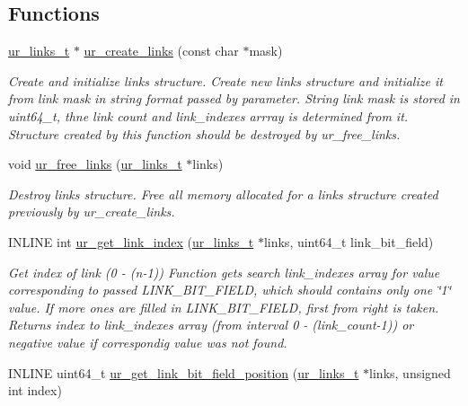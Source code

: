 \subsection*{Functions}
\begin{DoxyCompactItemize}
\item 
\hyperlink{structur__links__t}{ur\+\_\+links\+\_\+t} $\ast$ \hyperlink{group__ur__links_ga79615b30cdec474a94bb5ce5f3eeb34f}{ur\+\_\+create\+\_\+links} (const char $\ast$mask)
\begin{DoxyCompactList}\small\item\em Create and initialize links structure. Create new links structure and initialize it from link mask in string format passed by parameter. String link mask is stored in uint64\+\_\+t, thne link count and link\+\_\+indexes arrray is determined from it. Structure created by this function should be destroyed by ur\+\_\+free\+\_\+links. \end{DoxyCompactList}\item 
void \hyperlink{group__ur__links_ga7e1802498fc99e49f98eada58ff0d883}{ur\+\_\+free\+\_\+links} (\hyperlink{structur__links__t}{ur\+\_\+links\+\_\+t} $\ast$links)
\begin{DoxyCompactList}\small\item\em Destroy links structure. Free all memory allocated for a links structure created previously by ur\+\_\+create\+\_\+links. \end{DoxyCompactList}\item 
I\+N\+L\+I\+NE int \hyperlink{group__ur__links_ga20fe681784b2536ad4293ed1d2932da2}{ur\+\_\+get\+\_\+link\+\_\+index} (\hyperlink{structur__links__t}{ur\+\_\+links\+\_\+t} $\ast$links, uint64\+\_\+t link\+\_\+bit\+\_\+field)
\begin{DoxyCompactList}\small\item\em Get index of link (0 -\/ (n-\/1)) Function gets search link\+\_\+indexes array for value corresponding to passed L\+I\+N\+K\+\_\+\+B\+I\+T\+\_\+\+F\+I\+E\+LD, which should contains only one \char`\"{}1\char`\"{} value. If more ones are filled in L\+I\+N\+K\+\_\+\+B\+I\+T\+\_\+\+F\+I\+E\+LD, first from right is taken. Returns index to link\+\_\+indexes array (from interval 0 -\/ (link\+\_\+count-\/1)) or negative value if correspondig value was not found. \end{DoxyCompactList}\item 
I\+N\+L\+I\+NE uint64\+\_\+t \hyperlink{group__ur__links_ga469c39d33966e8752fc53a4fba154d10}{ur\+\_\+get\+\_\+link\+\_\+bit\+\_\+field\+\_\+position} (\hyperlink{structur__links__t}{ur\+\_\+links\+\_\+t} $\ast$links, unsigned int index)

\end{DoxyCompactItemize}
